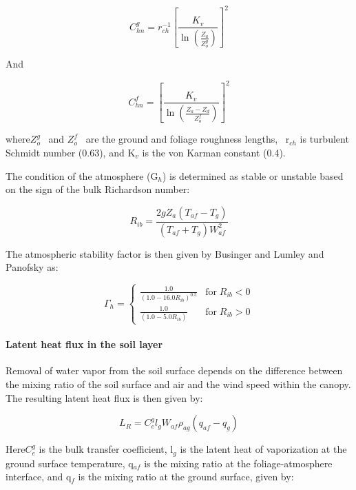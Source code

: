 \begin{equation}
C_{hn}^g = r_{ch}^{ - 1}{\left[ {\frac{{{K_v}}}{{\ln \left( \frac{Z_a}{Z_o^g} \right)}}} \right]^2}
\end{equation}

And

\begin{equation}
C_{hn}^f = {\left[ {\frac{{K_v}}{{\ln \left( \frac{{Z_a} - {Z_d}}{Z_o^f} \right)}}} \right]^2}
\end{equation}

where\(Z_o^g\) ~and \(Z_o^f\) ~are the ground and foliage roughness lengths,~ r\(_{ch}\) is turbulent Schmidt number (0.63), and K\(_{v}\) is the von Karman constant (0.4).

The condition of the atmosphere (G\(_{h}\)) is determined as stable or unstable based on the sign of the bulk Richardson number:

\begin{equation}
{R_{ib}} = \frac{{2g{Z_a}\left( {{T_{af}} - {T_g}} \right)}}{{\left( {{T_{af}} + {T_g}} \right)W_{af}^2}}
\end{equation}

The atmospheric stability factor is then given by Businger and Lumley and Panofsky as:

\begin{equation}
\Gamma_h = \left\{ 
    \begin{array}{cl}
      \frac{1.0}{\left( 1.0 - 16.0 R_{ib} \right)^{0.5}} & \text{for} \; R_{ib} < 0 \\
      \frac{1.0}{\left( 1.0 - 5.0  R_{ib} \right)      } & \text{for} \; R_{ib} > 0
    \end{array}
  \right.
\end{equation}

\paragraph{Latent heat flux in the soil layer}\label{latent-heat-flux-in-the-soil-layer}

Removal of water vapor from the soil surface depends on the difference between the mixing ratio of the soil surface and air and the wind speed within the canopy. The resulting latent heat flux is then given by:

\begin{equation}
{L_R} = C_e^g{l_g}{W_{af}}{\rho_{ag}}\left( {{q_{af}} - {q_g}} \right)
\end{equation}

Here\(C_e^g\) is the bulk transfer coefficient, l\(_{g}\) is the latent heat of vaporization at the ground surface temperature, q\(_{af}\) is the mixing ratio at the foliage-atmosphere interface, and q\(_{f}\) is the mixing ratio at the ground surface, given by:

